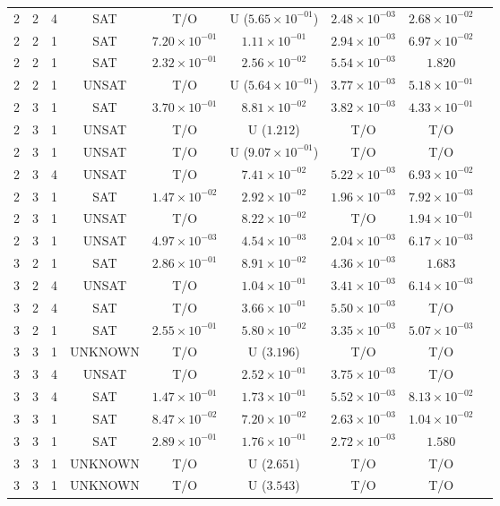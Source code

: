 \begin{table}
\begin{tabular}{ccccccccc}
2 & 2 & 4 & SAT & T/O & U ($5.65 \times 10^{-01}$) & $2.48 \times 10^{-03}$ & $2.68 \times 10^{-02}$ \\
2 & 2 & 1 & SAT & $7.20 \times 10^{-01}$ & $1.11 \times 10^{-01}$ & $2.94 \times 10^{-03}$ & $6.97 \times 10^{-02}$ \\
2 & 2 & 1 & SAT & $2.32 \times 10^{-01}$ & $2.56 \times 10^{-02}$ & $5.54 \times 10^{-03}$ & $1.820$ \\
2 & 2 & 1 & UNSAT & T/O & U ($5.64 \times 10^{-01}$) & $3.77 \times 10^{-03}$ & $5.18 \times 10^{-01}$ \\
2 & 3 & 1 & SAT & $3.70 \times 10^{-01}$ & $8.81 \times 10^{-02}$ & $3.82 \times 10^{-03}$ & $4.33 \times 10^{-01}$ \\
2 & 3 & 1 & UNSAT & T/O & U ($1.212$) & T/O & T/O \\
2 & 3 & 1 & UNSAT & T/O & U ($9.07 \times 10^{-01}$) & T/O & T/O \\
2 & 3 & 4 & UNSAT & T/O & $7.41 \times 10^{-02}$ & $5.22 \times 10^{-03}$ & $6.93 \times 10^{-02}$ \\
2 & 3 & 1 & SAT & $1.47 \times 10^{-02}$ & $2.92 \times 10^{-02}$ & $1.96 \times 10^{-03}$ & $7.92 \times 10^{-03}$ \\
2 & 3 & 1 & UNSAT & T/O & $8.22 \times 10^{-02}$ & T/O & $1.94 \times 10^{-01}$ \\
2 & 3 & 1 & UNSAT & $4.97 \times 10^{-03}$ & $4.54 \times 10^{-03}$ & $2.04 \times 10^{-03}$ & $6.17 \times 10^{-03}$ \\
3 & 2 & 1 & SAT & $2.86 \times 10^{-01}$ & $8.91 \times 10^{-02}$ & $4.36 \times 10^{-03}$ & $1.683$ \\
3 & 2 & 4 & UNSAT & T/O & $1.04 \times 10^{-01}$ & $3.41 \times 10^{-03}$ & $6.14 \times 10^{-03}$ \\
3 & 2 & 4 & SAT & T/O & $3.66 \times 10^{-01}$ & $5.50 \times 10^{-03}$ & T/O \\
3 & 2 & 1 & SAT & $2.55 \times 10^{-01}$ & $5.80 \times 10^{-02}$ & $3.35 \times 10^{-03}$ & $5.07 \times 10^{-03}$ \\
3 & 3 & 1 & UNKNOWN & T/O & U ($3.196$) & T/O & T/O \\
3 & 3 & 4 & UNSAT & T/O & $2.52 \times 10^{-01}$ & $3.75 \times 10^{-03}$ & T/O \\
3 & 3 & 4 & SAT & $1.47 \times 10^{-01}$ & $1.73 \times 10^{-01}$ & $5.52 \times 10^{-03}$ & $8.13 \times 10^{-02}$ \\
3 & 3 & 1 & SAT & $8.47 \times 10^{-02}$ & $7.20 \times 10^{-02}$ & $2.63 \times 10^{-03}$ & $1.04 \times 10^{-02}$ \\
3 & 3 & 1 & SAT & $2.89 \times 10^{-01}$ & $1.76 \times 10^{-01}$ & $2.72 \times 10^{-03}$ & $1.580$ \\
3 & 3 & 1 & UNKNOWN & T/O & U ($2.651$) & T/O & T/O \\
3 & 3 & 1 & UNKNOWN & T/O & U ($3.543$) & T/O & T/O \\
  \bottomrule
\end{tabular}
\end{table}

